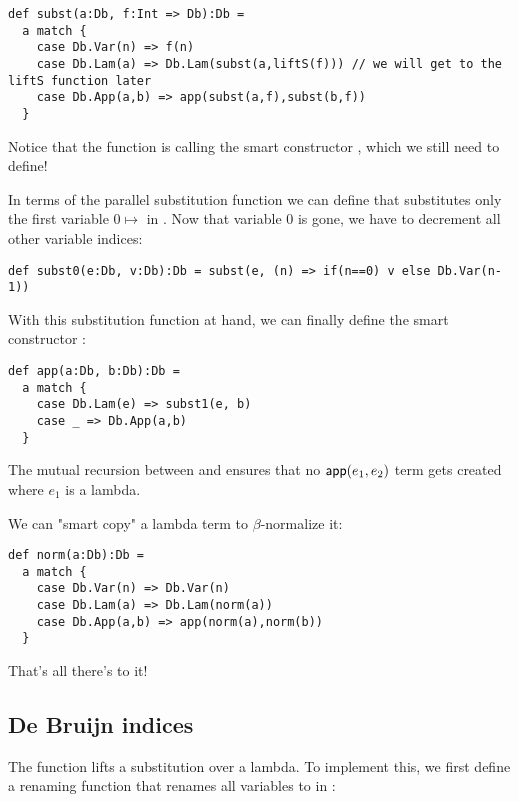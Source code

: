 \begin{minipage}{\textwidth}\begin{lstlisting}
def subst(a:Db, f:Int => Db):Db =
  a match {
    case Db.Var(n) => f(n)
    case Db.Lam(a) => Db.Lam(subst(a,liftS(f))) // we will get to the liftS function later
    case Db.App(a,b) => app(subst(a,f),subst(b,f))
  }
\end{lstlisting}\end{minipage}

Notice that the  function is calling the smart constructor , which we still need to define!

In terms of the parallel substitution function  we can define  that substitutes only the first variable $0 \mapsto$  in .
Now that variable $0$ is gone, we have to decrement all other variable indices:

\begin{lstlisting}
def subst0(e:Db, v:Db):Db = subst(e, (n) => if(n==0) v else Db.Var(n-1))
\end{lstlisting}

With this substitution function at hand, we can finally define the smart constructor :

\begin{lstlisting}
def app(a:Db, b:Db):Db =
  a match {
    case Db.Lam(e) => subst1(e, b)
    case _ => Db.App(a,b)
  }
\end{lstlisting}

The mutual recursion between  and  ensures that no $\mathsf{app}(e_1,e_2)$ term gets created where $e_1$ is a lambda.

We can "smart copy" a lambda term to $\beta$-normalize it:

\begin{lstlisting}
def norm(a:Db):Db =
  a match {
    case Db.Var(n) => Db.Var(n)
    case Db.Lam(a) => Db.Lam(norm(a))
    case Db.App(a,b) => app(norm(a),norm(b))
  }
\end{lstlisting}

That's all there's to it!

\subsection{De Bruijn indices}

The  function lifts a substitution over a lambda.
To implement this, we first define a renaming function  that renames all variables  to  in :

